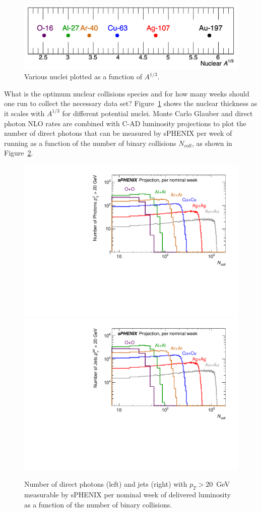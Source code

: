 \begin{figure}[h]
    \centering
    \includegraphics[width=0.85\linewidth]{figs/figure_A.png}
    \caption{Various nuclei plotted as a function of $A^{1/3}$.}
    \label{fig:figA}
\end{figure}

What is the optimum nuclear collisions species and for how many weeks should one run to collect the necessary data set?    Figure~\ref{fig:figA} shows the nuclear thickness as it scales with $A^{1/3}$ for different potential nuclei.   Monte Carlo Glauber and direct photon NLO rates are combined with C-AD luminosity projections to plot the number of direct photons 
that can be measured by sPHENIX per week of running as a function of the number of binary collisions $N_{coll}$, as shown in Figure~\ref{fig:figSmallPhoton}.

\begin{figure}[h]
    \centering
    \includegraphics[width=0.48\linewidth]{figs/sPHENIX_BUP_SmallSystems_PhotonProjection}
    \includegraphics[width=0.48\linewidth]{figs/sPHENIX_BUP_SmallSystems_JetProjection}
    \caption{Number of direct photons (left) and jets (right) with $p_T > 20$~GeV measurable by sPHENIX per nominal week of delivered luminosity as a function of the number of binary collisions.}
    \label{fig:figSmallPhoton}
\end{figure}


